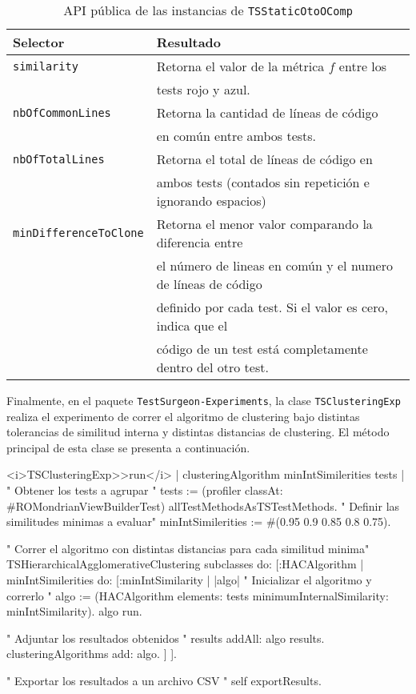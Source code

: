 \begin{table}[h] 
    \centering 
    \begin{tabular}{|l|l|}
    	\hline
\textbf{Selector} & \textbf{Resultado} \\ \hline \hline

{\tt similarity} & Retorna el valor de la métrica $f$ entre los \\
				 & tests rojo y azul. \\ \hline	
{\tt nbOfCommonLines } & Retorna la cantidad de líneas de código \\
				 & en común entre ambos tests.\\ \hline
{\tt nbOfTotalLines} & Retorna el total de líneas de código en \\
				 & ambos tests (contados sin repetición e ignorando espacios)\\ \hline
{\tt minDifferenceToClone}	& Retorna el menor valor comparando la diferencia entre \\
				 & el número de lineas en común y el numero de líneas de código \\
				 & definido por cada test. Si el valor es cero, indica que el \\
				 & código de un test está completamente dentro del otro test.\\ \hline 
    \end{tabular}
    \caption{API pública de las instancias de {\tt TSStaticOtoOComp}}
\end{table} 

\clearpage
\par Finalmente, en el paquete {\tt TestSurgeon-Experiments}, la clase {\tt TSClusteringExp} realiza el experimento de correr el algoritmo de clustering bajo distintas tolerancias de similitud interna y distintas distancias de clustering. El método principal de esta clase se presenta a continuación.

\begin{codeWithLineNumbers}
<i>TSClusteringExp>>run</i>
	| clusteringAlgorithm minIntSimilerities tests |
	" Obtener los tests a agrupar "
	tests := (profiler classAt: #ROMondrianViewBuilderTest) allTestMethodsAsTSTestMethods.
	" Definir las similitudes minimas a evaluar" 
	minIntSimilerities := #(0.95 0.9 0.85 0.8 0.75).
	
	" Correr el algoritmo con distintas distancias para cada similitud minima"
	TSHierarchicalAgglomerativeClustering subclasses do: [:HACAlgorithm |
		minIntSimilerities do: [:minIntSimilarity |
			|algo|
			" Inicializar el algoritmo y correrlo "
			algo := (HACAlgorithm 	
							elements: tests
			  				minimumInternalSimilarity: minIntSimilarity).
			algo run.
			
			" Adjuntar los resultados obtenidos "
			results addAll: algo results.
			clusteringAlgorithms add: algo.
		]
	].
	
	" Exportar los resultados a un archivo CSV "
	self exportResults.
\end{codeWithLineNumbers}


